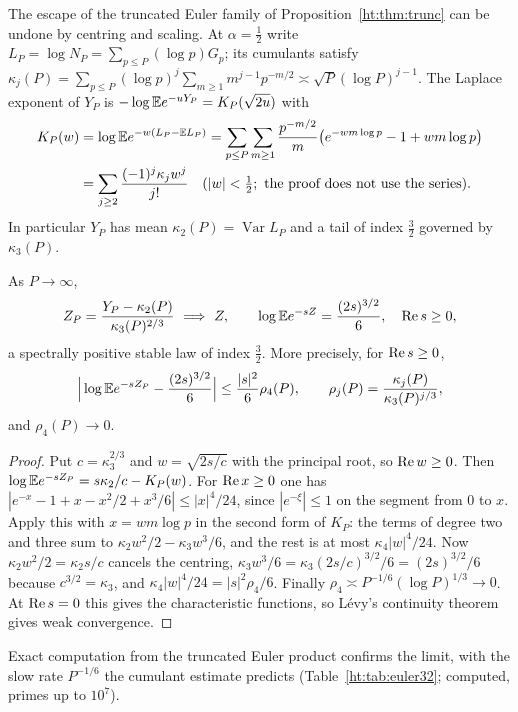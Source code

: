 The escape of the truncated Euler family of Proposition~\ref{ht:thm:trunc} can be undone by centring and scaling. At $\alpha=\frac12$ write $L_P=\log N_P=\sum_{p\le P}(\log p)G_p$; its cumulants satisfy $\kappa_j(P)=\sum_{p\le P}(\log p)^j\sum_{m\ge1}m^{j-1}p^{-m/2}\asymp\sqrt P(\log P)^{j-1}$. The Laplace exponent of $Y_P$ is $-\log\mathbb{E} e^{-uY_P}=K_P(\sqrt{2u})$ with
\[
\begin{split}K_P(w)&=\log\mathbb{E} e^{-w(L_P-\mathbb{E} L_P)}=\sum_{p\le P}\sum_{m\ge1}\frac{p^{-m/2}}m\big(e^{-wm\log p}-1+wm\log p\big)\\&=\sum_{j\ge2}\frac{(-1)^j\kappa_jw^j}{j!}\quad(|w|<\tfrac12;\text{ the proof does not use the series}).\end{split}
\]
In particular $Y_P$ has mean $\kappa_2(P)=\operatorname{Var}L_P$ and a tail of index $\frac32$ governed by $\kappa_3(P)$.

\begin{theorem}\label{ht:thm:32}
As $P\to\infty$,
\[
Z_P=\frac{Y_P-\kappa_2(P)}{\kappa_3(P)^{2/3}}\ \Longrightarrow\ Z,\qquad \log\E e^{-sZ}=\frac{(2s)^{3/2}}6,\quad\re s\ge0,
\]
a spectrally positive stable law of index $\frac32$. More precisely, for $\operatorname{Re} s\ge0$,
\[
\Big|\log\mathbb{E} e^{-sZ_P}-\frac{(2s)^{3/2}}6\Big|\le\frac{|s|^2}6\rho_4(P),\qquad\rho_j(P)=\frac{\kappa_j(P)}{\kappa_3(P)^{j/3}},
\]
and $\rho_4(P)\to0$.
\end{theorem}

\begin{proof}
Put $c=\kappa_3^{2/3}$ and $w=\sqrt{2s/c}$ with the principal root, so $\operatorname{Re} w\ge0$. Then $\log\mathbb{E} e^{-sZ_P}=s\kappa_2/c-K_P(w)$. For $\operatorname{Re} x\ge0$ one has $|e^{-x}-1+x-x^2/2+x^3/6|\le|x|^4/24$, since $|e^{-\xi}|\le1$ on the segment from $0$ to $x$. Apply this with $x=wm\log p$ in the second form of $K_P$: the terms of degree two and three sum to $\kappa_2w^2/2-\kappa_3w^3/6$, and the rest is at most $\kappa_4|w|^4/24$. Now $\kappa_2w^2/2=\kappa_2s/c$ cancels the centring, $\kappa_3w^3/6=\kappa_3(2s/c)^{3/2}/6=(2s)^{3/2}/6$ because $c^{3/2}=\kappa_3$, and $\kappa_4|w|^4/24=|s|^2\rho_4/6$. Finally $\rho_4\asymp P^{-1/6}(\log P)^{1/3}\to0$. At $\operatorname{Re} s=0$ this gives the characteristic functions, so L\'evy's continuity theorem gives weak convergence.
\end{proof}

Exact computation from the truncated Euler product confirms the limit, with the slow rate $P^{-1/6}$ the cumulant estimate predicts (Table~\ref{ht:tab:euler32}; computed, primes up to $10^7$).

